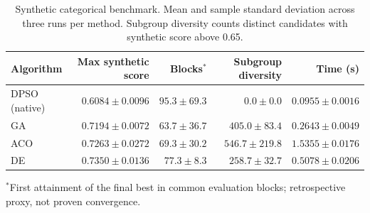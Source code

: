 \begin{table}[t]
\centering
\caption{Synthetic categorical benchmark. Mean and sample standard deviation across three runs per method. Subgroup diversity counts distinct candidates with synthetic score above 0.65.}
\label{tab:synthetic}
\begin{tabular}{lrrrr}
\toprule
Algorithm & Max synthetic score & Blocks$^{*}$ & Subgroup diversity & Time (s) \\
\midrule
DPSO (native) & $0.6084 \pm 0.0096$ & $95.3 \pm 69.3$ & $0.0 \pm 0.0$ & $0.0955 \pm 0.0016$ \\
GA & $0.7194 \pm 0.0072$ & $63.7 \pm 36.7$ & $405.0 \pm 83.4$ & $0.2643 \pm 0.0049$ \\
ACO & $0.7263 \pm 0.0272$ & $69.3 \pm 30.2$ & $546.7 \pm 219.8$ & $1.5355 \pm 0.0176$ \\
DE & $0.7350 \pm 0.0136$ & $77.3 \pm 8.3$ & $258.7 \pm 32.7$ & $0.5078 \pm 0.0206$ \\
\bottomrule
\end{tabular}
\par\smallskip\footnotesize $^{*}$First attainment of the final best in common evaluation blocks; retrospective proxy, not proven convergence.
\end{table}
